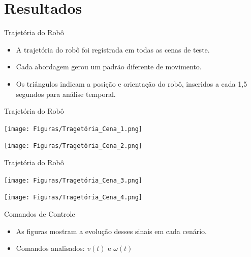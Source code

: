 \documentclass{beamer}
\begin{document}
\section{Resultados}

\begin{frame}{Trajetória do Robô}
  \begin{itemize}
    \item A trajetória do robô foi registrada em todas as cenas de teste.
    \item Cada abordagem gerou um padrão diferente de movimento.
    \item Os triângulos indicam a posição e orientação do robô, inseridos a cada 1,5 segundos para análise temporal.
  \end{itemize}
\end{frame}

\begin{frame}{Trajetória do Robô}
\begin{minipage}{0.48\linewidth}
    \centering
    \texttt{[image: Figuras/Tragetória\_Cena\_1.png]}
  \end{minipage}
  \hfill
  \begin{minipage}{0.48\linewidth}
    \centering
    \texttt{[image: Figuras/Tragetória\_Cena\_2.png]}
  \end{minipage}
\end{frame}

\begin{frame}{Trajetória do Robô}
\begin{minipage}{0.48\linewidth}
    \centering
    \texttt{[image: Figuras/Tragetória\_Cena\_3.png]}
  \end{minipage}
  \hfill
  \begin{minipage}{0.48\linewidth}
    \centering
    \texttt{[image: Figuras/Tragetória\_Cena\_4.png]}
  \end{minipage}
\end{frame}

\begin{frame}{Comandos de Controle}
  \begin{itemize}
    \item As figuras mostram a evolução desses sinais em cada cenário.
    \item Comandos analisados: $v(t)$ e $\omega(t)$
  \end{itemize}
\end{frame}
\end{document}
